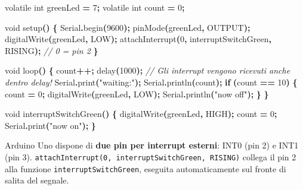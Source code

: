 \documentclass[
  italian,
  openany]{book}
\newenvironment{Shaded}{\begin{snugshade}}{\end{snugshade}}
\newcommand{\AttributeTok}[1]{\textcolor[rgb]{0.13,0.29,0.53}{#1}}
\newcommand{\CommentTok}[1]{\textcolor[rgb]{0.56,0.35,0.01}{\textit{#1}}}
\newcommand{\ControlFlowTok}[1]{\textcolor[rgb]{0.13,0.29,0.53}{\textbf{#1}}}
\newcommand{\DataTypeTok}[1]{\textcolor[rgb]{0.13,0.29,0.53}{#1}}
\newcommand{\DecValTok}[1]{\textcolor[rgb]{0.00,0.00,0.81}{#1}}
\newcommand{\NormalTok}[1]{#1}
\newcommand{\OperatorTok}[1]{\textcolor[rgb]{0.81,0.36,0.00}{\textbf{#1}}}
\newcommand{\StringTok}[1]{\textcolor[rgb]{0.31,0.60,0.02}{#1}}
\begin{document}
\begin{Shaded}
\begin{Highlighting}[]
\AttributeTok{volatile} \DataTypeTok{int}\NormalTok{ greenLed }\OperatorTok{=} \DecValTok{7}\OperatorTok{;}
\AttributeTok{volatile} \DataTypeTok{int}\NormalTok{ count }\OperatorTok{=} \DecValTok{0}\OperatorTok{;}

\DataTypeTok{void}\NormalTok{ setup}\OperatorTok{()} \OperatorTok{\{}
\NormalTok{  Serial}\OperatorTok{.}\NormalTok{begin}\OperatorTok{(}\DecValTok{9600}\OperatorTok{);}
\NormalTok{  pinMode}\OperatorTok{(}\NormalTok{greenLed}\OperatorTok{,}\NormalTok{ OUTPUT}\OperatorTok{);}
\NormalTok{  digitalWrite}\OperatorTok{(}\NormalTok{greenLed}\OperatorTok{,}\NormalTok{ LOW}\OperatorTok{);}
\NormalTok{  attachInterrupt}\OperatorTok{(}\DecValTok{0}\OperatorTok{,}\NormalTok{ interruptSwitchGreen}\OperatorTok{,}\NormalTok{ RISING}\OperatorTok{);} \CommentTok{// 0 = pin 2}
\OperatorTok{\}}

\DataTypeTok{void}\NormalTok{ loop}\OperatorTok{()} \OperatorTok{\{}
\NormalTok{  count}\OperatorTok{++;}
\NormalTok{  delay}\OperatorTok{(}\DecValTok{1000}\OperatorTok{);}
  \CommentTok{// Gli interrupt vengono ricevuti anche dentro delay!}
\NormalTok{  Serial}\OperatorTok{.}\NormalTok{print}\OperatorTok{(}\StringTok{"waiting:"}\OperatorTok{);}
\NormalTok{  Serial}\OperatorTok{.}\NormalTok{println}\OperatorTok{(}\NormalTok{count}\OperatorTok{);}
  \ControlFlowTok{if} \OperatorTok{(}\NormalTok{count }\OperatorTok{==} \DecValTok{10}\OperatorTok{)} \OperatorTok{\{}
\NormalTok{    count }\OperatorTok{=} \DecValTok{0}\OperatorTok{;}
\NormalTok{    digitalWrite}\OperatorTok{(}\NormalTok{greenLed}\OperatorTok{,}\NormalTok{ LOW}\OperatorTok{);}
\NormalTok{    Serial}\OperatorTok{.}\NormalTok{println}\OperatorTok{(}\StringTok{"now off"}\OperatorTok{);}
  \OperatorTok{\}}
\OperatorTok{\}}

\DataTypeTok{void}\NormalTok{ interruptSwitchGreen}\OperatorTok{()} \OperatorTok{\{}
\NormalTok{  digitalWrite}\OperatorTok{(}\NormalTok{greenLed}\OperatorTok{,}\NormalTok{ HIGH}\OperatorTok{);}
\NormalTok{  count }\OperatorTok{=} \DecValTok{0}\OperatorTok{;}
\NormalTok{  Serial}\OperatorTok{.}\NormalTok{print}\OperatorTok{(}\StringTok{"now on"}\OperatorTok{);}
\OperatorTok{\}}
\end{Highlighting}
\end{Shaded}

Arduino Uno dispone di \textbf{due pin per interrupt esterni}: INT0 (pin
2) e INT1 (pin 3).
\texttt{attachInterrupt(0,\ interruptSwitchGreen,\ RISING)} collega il
pin 2 alla funzione \texttt{interruptSwitchGreen}, eseguita
automaticamente sul fronte di salita del segnale.
\end{document}
